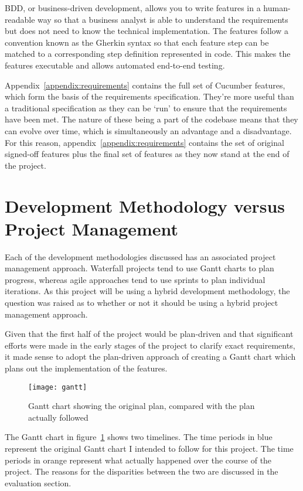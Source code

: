 BDD, or business-driven development, allows you to write features in a human-readable way so that a business analyst is able to understand the requirements but does not need to know the technical implementation. The features follow a convention known as the Gherkin syntax so that each feature step can be matched to a corresponding step definition represented in code. This makes the features executable and allows automated end-to-end testing.

Appendix~\ref{appendix:requirements} contains the full set of Cucumber features, which form the basis of the requirements specification. They're more useful than a traditional specification as they can be `run' to ensure that the requirements have been met. The nature of these being a part of the codebase means that they can evolve over time, which is simultaneously an advantage and a disadvantage. For this reason, appendix~\ref{appendix:requirements} contains the set of original signed-off features plus the final set of features as they now stand at the end of the project.

\section{Development Methodology versus Project Management}

Each of the development methodologies discussed has an associated project management approach. Waterfall projects tend to use Gantt charts to plan progress, whereas agile approaches tend to use sprints to plan individual iterations. As this project will be using a hybrid development methodology, the question was raised as to whether or not it should be using a hybrid project management approach.

Given that the first half of the project would be plan-driven and that significant efforts were made in the early stages of the project to clarify exact requirements, it made sense to adopt the plan-driven approach of creating a Gantt chart which plans out the implementation of the features.

\begin{figure}[h!]
  \centering
    \ifimages
    \texttt{[image: gantt]}
    \fi
  \caption{Gantt chart showing the original plan, compared with the plan actually followed}
  \label{uml:gantt}
\end{figure}

The Gantt chart in figure~\ref{uml:gantt} shows two timelines. The time periods in blue represent the original Gantt chart I intended to follow for this project. The time periods in orange represent what actually happened over the course of the project. The reasons for the disparities between the two are discussed in the evaluation section.

